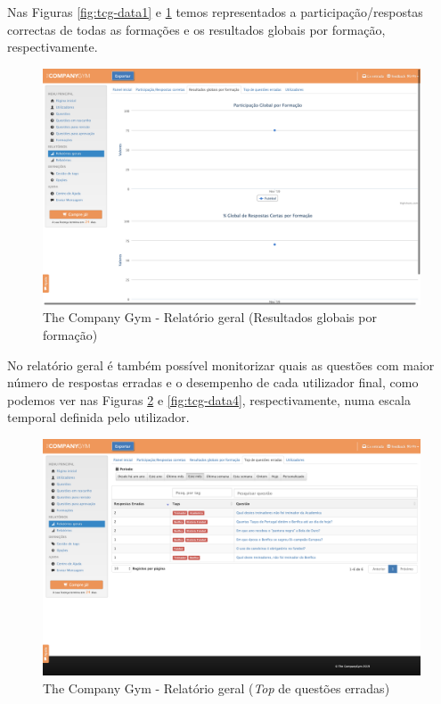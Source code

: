 Nas Figuras \ref{fig:tcg-data1} e \ref{fig:tcg-data2} temos representados a participação/respostas correctas de todas as formações e os resultados globais por formação, respectivamente.

\begin{figure}[ht!]
	\begin{center}
		\includegraphics[width=1\textwidth]{img/tcg/tcg-data2.png}
		\caption{The Company Gym - Relatório geral (Resultados globais por formação)}
		\label{fig:tcg-data2}
	\end{center}
\end{figure}

\newpage


No relatório geral é também possível monitorizar quais as questões com maior número de respostas erradas e o desempenho de cada utilizador final, como podemos ver nas Figuras \ref{fig:tcg-data3} e \ref{fig:tcg-data4}, respectivamente, numa escala temporal definida pelo utilizador. 

\begin{figure}[ht!]
	\begin{center}
		\includegraphics[width=1\textwidth]{img/tcg/tcg-data3.png}
		\caption{The Company Gym - Relatório geral (\textit{Top} de questões erradas)}
		\label{fig:tcg-data3}
	\end{center}
\end{figure}

